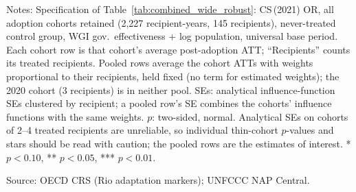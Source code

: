 \begin{table}[H]
\begin{minipage}{\linewidth}\footnotesize
Notes: Specification of Table~\ref{tab:combined_wide_robust}: CS\,(2021) OR, all adoption cohorts retained (2,227 recipient-years, 145 recipients), never-treated control group, WGI gov.\ effectiveness + log population, universal base period. Each cohort row is that cohort's average post-adoption ATT; ``Recipients'' counts its treated recipients. Pooled rows average the cohort ATTs with weights proportional to their recipients, held fixed (no term for estimated weights); the 2020 cohort (3 recipients) is in neither pool. SEs: analytical influence-function SEs clustered by recipient; a pooled row's SE combines the cohorts' influence functions with the same weights. $p$: two-sided, normal. Analytical SEs on cohorts of 2--4 treated recipients are unreliable, so individual thin-cohort $p$-values and stars should be read with caution; the pooled rows are the estimates of interest. * $p<0.10$, ** $p<0.05$, *** $p<0.01$.\par
Source: OECD CRS (Rio adaptation markers); UNFCCC NAP Central.
\end{minipage}
\end{table}
